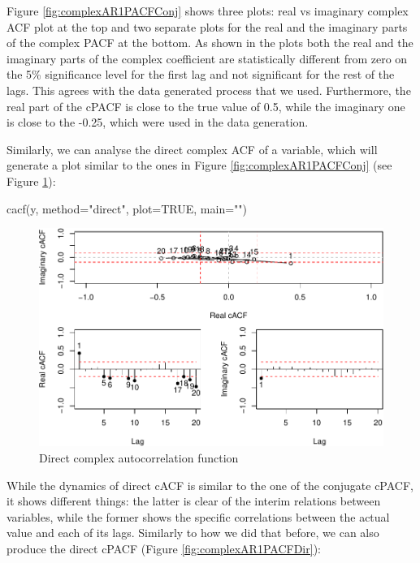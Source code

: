 \documentclass[
]{book}
\newenvironment{Shaded}{\begin{snugshade}}{\end{snugshade}}
\newcommand{\AttributeTok}[1]{\textcolor[rgb]{0.77,0.63,0.00}{#1}}
\newcommand{\ConstantTok}[1]{\textcolor[rgb]{0.00,0.00,0.00}{#1}}
\newcommand{\FunctionTok}[1]{\textcolor[rgb]{0.00,0.00,0.00}{#1}}
\newcommand{\NormalTok}[1]{#1}
\newcommand{\StringTok}[1]{\textcolor[rgb]{0.31,0.60,0.02}{#1}}
\begin{document}
Figure \ref{fig:complexAR1PACFConj} shows three plots: real vs imaginary complex ACF plot at the top and two separate plots for the real and the imaginary parts of the complex PACF at the bottom. As shown in the plots both the real and the imaginary parts of the complex coefficient are statistically different from zero on the 5\% significance level for the first lag and not significant for the rest of the lags. This agrees with the data generated process that we used. Furthermore, the real part of the cPACF is close to the true value of 0.5, while the imaginary one is close to the -0.25, which were used in the data generation.

Similarly, we can analyse the direct complex ACF of a variable, which will generate a plot similar to the ones in Figure \ref{fig:complexAR1PACFConj} (see Figure \ref{fig:complexAR1ACFDir}):

\begin{Shaded}
\begin{Highlighting}[]
\FunctionTok{cacf}\NormalTok{(y, }\AttributeTok{method=}\StringTok{"direct"}\NormalTok{, }\AttributeTok{plot=}\ConstantTok{TRUE}\NormalTok{, }\AttributeTok{main=}\StringTok{""}\NormalTok{)}
\end{Highlighting}
\end{Shaded}

\begin{figure}
\centering
\includegraphics{Svetunkov---Svetunkov---Complex-Valued-Econometrics_files/figure-latex/complexAR1ACFDir-1.pdf}
\caption{\label{fig:complexAR1ACFDir}Direct complex autocorrelation function}
\end{figure}

While the dynamics of direct cACF is similar to the one of the conjugate cPACF, it shows different things: the latter is clear of the interim relations between variables, while the former shows the specific correlations between the actual value and each of its lags. Similarly to how we did that before, we can also produce the direct cPACF (Figure \ref{fig:complexAR1PACFDir}):
\end{document}
